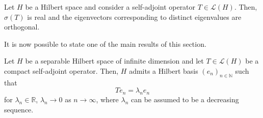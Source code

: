 \begin{proposition}
    Let \(H\) be a Hilbert space and consider a self-adjoint operator \(T\in \mathcal{L}(H)\). Then, \(\sigma(T)\) is real and the eigenvectors corresponding to distinct eigenvalues are orthogonal.
\end{proposition}
It is now possible to state one of the main results of this section.
\begin{theorem}\label{spectral_theorem}
    Let \(H\) be a separable Hilbert space of infinite dimension and let \(T \in \mathcal{L}(H)\) be a compact self-adjoint operator. Then, \(H\) admits a Hilbert basis \((e_n)_{n \in \mathbb{N}}\) such that
    \[
        T e_n = \lambda_n e_n
    \]
    for \(\lambda_n \in \mathbb{R}\), \(\lambda_n \rightarrow 0\) as \(n \rightarrow \infty\), where \(\lambda_n\) can be assumed to be a decreasing sequence.
\end{theorem}

